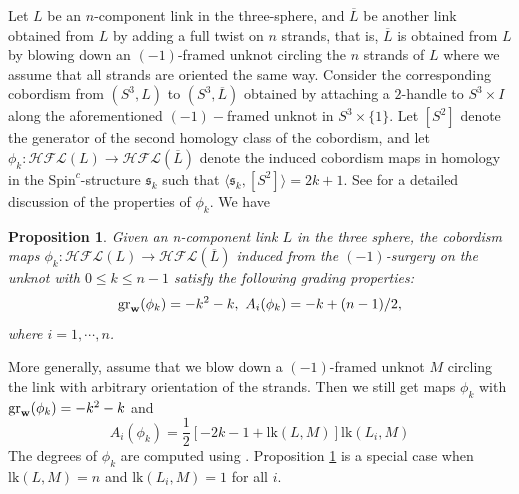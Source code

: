 \documentclass{amsart}
\newtheorem{proposition}[theorem]{Proposition}
\newcommand{\cHFL}{\mathcal{H\!F\! L}}
\newcommand{\lk}{\mathrm{lk}}
\newcommand{\w}{\mathbf{w}}
\newcommand{\spinc}{\text{Spin}^{c}}
\def\gr{\textup{gr}}
\def\w{{\bf{w}}}
\newcommand{\EG}[1]{{\color{red}#1}}
\begin{document}
Let $L$ be an $n$-component link in the three-sphere, and $\overline{L}$ be another link obtained from $L$ by 
adding a full twist on $n$ strands, that is, $\overline{L}$ is  obtained from $L$ by blowing down an $(-1)$-framed unknot circling the $n$ strands of $L$ where we assume that all strands are oriented the same way. Consider the corresponding cobordism from $(S^3, L)$ to $(S^3, \overline{L})$ obtained by attaching a $2$-handle to $S^3\times I$ along the aforementioned $(-1)-$framed unknot in $S^3\times\{1\}$. Let $[S^2]$ denote the generator of the second homology class of the cobordism, and let $\phi_k:\cHFL(L)\to \cHFL(\overline{L})$ denote the induced cobordism maps in homology in the $\spinc$-structure $\mathfrak{s}_k$ such that  $\langle \mathfrak{s}_k, [S^2]\rangle =2k+1$.  See \cite{AGL} for a detailed discussion of the properties of $\phi_k$.  We have

\begin{proposition}\cite{AGL}\label{prop:gradingshifts}
Given an n-component link $L$ in the three sphere, the cobordism maps $\phi_k:\cHFL(L)\to\cHFL(\overline{L}) $ induced from the $(-1)$-surgery on the unknot with $0\leq k\leq n-1$ satisfy the following grading properties:
$$
\gr_{\w}(\phi_k)=-k^2-k,\ A_i(\phi_k)=-k+(n-1)/2,
$$
where $i=1, \cdots, n$. 
\end{proposition}

More generally, assume that we blow down a $(-1)$-framed unknot $M$ circling the link with arbitrary orientation of the strands. Then  we still get maps $\phi_{k}$ with $\gr_{\w}(\phi_k)=-k^2-k$ and
\begin{equation}
\label{eq: Alexander shift generalized}
A_i(\phi_{k})=\frac{1}{2}\left[-2k-1+\lk(L,M)\right]\lk(L_i,M)
\end{equation}
The degrees of $\phi_k$ are computed using \cite{Zemke2}.
 Proposition \ref{prop:gradingshifts} is a special case when $\lk(L,M)=n$ and $\lk(L_i,M)=1$  for all $i$.

\end{document}

